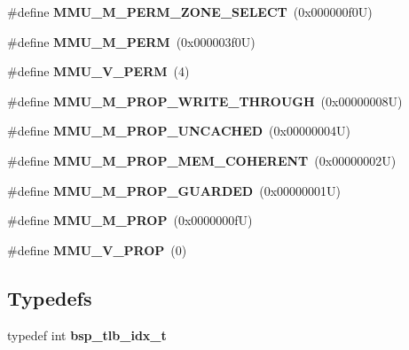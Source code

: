 \begin{DoxyCompactItemize}
\item 
\mbox{\label{group__Virtex4MMU_gaeed949010a7b0deb679a97379b71fb57}} 
\#define {\bfseries M\+M\+U\+\_\+\+M\+\_\+\+P\+E\+R\+M\+\_\+\+Z\+O\+N\+E\+\_\+\+S\+E\+L\+E\+CT}~(0x000000f0\+U)
\item 
\mbox{\label{group__Virtex4MMU_ga712babb973a3cad185a6bfcbd33e38ab}} 
\#define {\bfseries M\+M\+U\+\_\+\+M\+\_\+\+P\+E\+RM}~(0x000003f0\+U)
\item 
\mbox{\label{group__Virtex4MMU_gad562e59203e348d1ab694633b5501b41}} 
\#define {\bfseries M\+M\+U\+\_\+\+V\+\_\+\+P\+E\+RM}~(4)
\item 
\mbox{\label{group__Virtex4MMU_ga967d05b3e012f38983e8296cec375a1b}} 
\#define {\bfseries M\+M\+U\+\_\+\+M\+\_\+\+P\+R\+O\+P\+\_\+\+W\+R\+I\+T\+E\+\_\+\+T\+H\+R\+O\+U\+GH}~(0x00000008\+U)
\item 
\mbox{\label{group__Virtex4MMU_gac670c1b1b670a3690ac4f95c9ea0246d}} 
\#define {\bfseries M\+M\+U\+\_\+\+M\+\_\+\+P\+R\+O\+P\+\_\+\+U\+N\+C\+A\+C\+H\+ED}~(0x00000004\+U)
\item 
\mbox{\label{group__Virtex4MMU_ga85dea8a59dbe31fd35cd88a1f075a3c9}} 
\#define {\bfseries M\+M\+U\+\_\+\+M\+\_\+\+P\+R\+O\+P\+\_\+\+M\+E\+M\+\_\+\+C\+O\+H\+E\+R\+E\+NT}~(0x00000002\+U)
\item 
\mbox{\label{group__Virtex4MMU_ga1851aa478354abdb7699b5aad912d2ab}} 
\#define {\bfseries M\+M\+U\+\_\+\+M\+\_\+\+P\+R\+O\+P\+\_\+\+G\+U\+A\+R\+D\+ED}~(0x00000001\+U)
\item 
\mbox{\label{group__Virtex4MMU_ga4eb534b0ce728f987cf098ead4720a97}} 
\#define {\bfseries M\+M\+U\+\_\+\+M\+\_\+\+P\+R\+OP}~(0x0000000f\+U)
\item 
\mbox{\label{group__Virtex4MMU_ga34b7b44b54605318f3c106ed80224bcd}} 
\#define {\bfseries M\+M\+U\+\_\+\+V\+\_\+\+P\+R\+OP}~(0)
\end{DoxyCompactItemize}
\subsection*{Typedefs}
\begin{DoxyCompactItemize}
\item 
\mbox{\label{group__Virtex4MMU_ga006c180c0373720f8b4891b3759ade1f}} 
typedef int {\bfseries bsp\+\_\+tlb\+\_\+idx\+\_\+t}
\end{DoxyCompactItemize}
